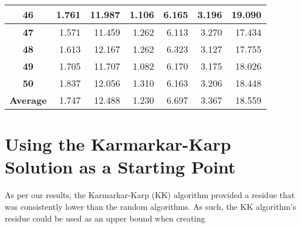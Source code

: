 \documentclass[12pt]{article}
\begin{document}
\begin{table}[!htbp]
{\begin{tabular}{crrrrr|r|}
\multicolumn{1}{|c|}{\textbf{46}} & \multicolumn{1}{r|}{1.761} & \multicolumn{1}{r|}{11.987} & \multicolumn{1}{r|}{1.106} & \multicolumn{1}{r|}{6.165} & 3.196 & 19.090 \\ \hline
\multicolumn{1}{|c|}{\textbf{47}} & \multicolumn{1}{r|}{1.571} & \multicolumn{1}{r|}{11.459} & \multicolumn{1}{r|}{1.262} & \multicolumn{1}{r|}{6.113} & 3.270 & 17.434 \\ \hline
\multicolumn{1}{|c|}{\textbf{48}} & \multicolumn{1}{r|}{1.613} & \multicolumn{1}{r|}{12.167} & \multicolumn{1}{r|}{1.262} & \multicolumn{1}{r|}{6.323} & 3.127 & 17.755 \\ \hline
\multicolumn{1}{|c|}{\textbf{49}} & \multicolumn{1}{r|}{1.705} & \multicolumn{1}{r|}{11.707} & \multicolumn{1}{r|}{1.082} & \multicolumn{1}{r|}{6.170} & 3.175 & 18.026 \\ \hline
\multicolumn{1}{|c|}{\textbf{50}} & \multicolumn{1}{r|}{1.837} & \multicolumn{1}{r|}{12.056} & \multicolumn{1}{r|}{1.310} & \multicolumn{1}{r|}{6.163} & 3.206 & 18.448 \\ \hline
\multicolumn{1}{|c|}{\textbf{Average}} & \multicolumn{1}{r|}{1.747} & \multicolumn{1}{r|}{12.488} & \multicolumn{1}{r|}{1.230} & \multicolumn{1}{r|}{6.697} & 3.367 & 18.559 \\ \hline
\end{tabular}%
}
\end{table}

\section{Using the Karmarkar-Karp Solution as a Starting Point}
As per our results, the Karmarkar-Karp (KK) algorithm provided a residue that was consistently lower than the random algorithms. As such, the KK algorithm's residue could be used as an upper bound when creating 
\end{document}
